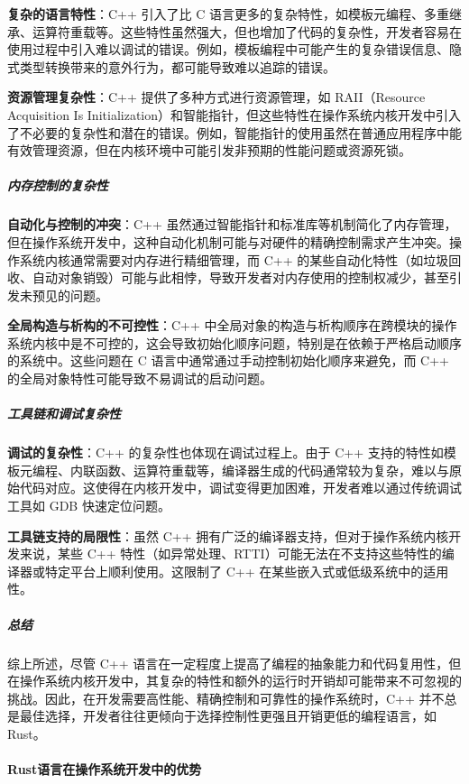 \textbf{复杂的语言特性}：C++ 引入了比 C 语言更多的复杂特性，如模板元编程、多重继承、运算符重载等。这些特性虽然强大，但也增加了代码的复杂性，开发者容易在使用过程中引入难以调试的错误。例如，模板编程中可能产生的复杂错误信息、隐式类型转换带来的意外行为，都可能导致难以追踪的错误。

\textbf{资源管理复杂性}：C++ 提供了多种方式进行资源管理，如 RAII（Resource Acquisition Is Initialization）和智能指针，但这些特性在操作系统内核开发中引入了不必要的复杂性和潜在的错误。例如，智能指针的使用虽然在普通应用程序中能有效管理资源，但在内核环境中可能引发非预期的性能问题或资源死锁。

\subparagraph{内存控制的复杂性}

\textbf{自动化与控制的冲突}：C++ 虽然通过智能指针和标准库等机制简化了内存管理，但在操作系统开发中，这种自动化机制可能与对硬件的精确控制需求产生冲突。操作系统内核通常需要对内存进行精细管理，而 C++ 的某些自动化特性（如垃圾回收、自动对象销毁）可能与此相悖，导致开发者对内存使用的控制权减少，甚至引发未预见的问题。

\textbf{全局构造与析构的不可控性}：C++ 中全局对象的构造与析构顺序在跨模块的操作系统内核中是不可控的，这会导致初始化顺序问题，特别是在依赖于严格启动顺序的系统中。这些问题在 C 语言中通常通过手动控制初始化顺序来避免，而 C++ 的全局对象特性可能导致不易调试的启动问题。

\subparagraph{工具链和调试复杂性}

\textbf{调试的复杂性}：C++ 的复杂性也体现在调试过程上。由于 C++ 支持的特性如模板元编程、内联函数、运算符重载等，编译器生成的代码通常较为复杂，难以与原始代码对应。这使得在内核开发中，调试变得更加困难，开发者难以通过传统调试工具如 GDB 快速定位问题。

\textbf{工具链支持的局限性}：虽然 C++ 拥有广泛的编译器支持，但对于操作系统内核开发来说，某些 C++ 特性（如异常处理、RTTI）可能无法在不支持这些特性的编译器或特定平台上顺利使用。这限制了 C++ 在某些嵌入式或低级系统中的适用性。

\subparagraph{总结}

综上所述，尽管 C++ 语言在一定程度上提高了编程的抽象能力和代码复用性，但在操作系统内核开发中，其复杂的特性和额外的运行时开销却可能带来不可忽视的挑战。因此，在开发需要高性能、精确控制和可靠性的操作系统时，C++ 并不总是最佳选择，开发者往往更倾向于选择控制性更强且开销更低的编程语言，如 Rust。

\paragraph{Rust语言在操作系统开发中的优势}

